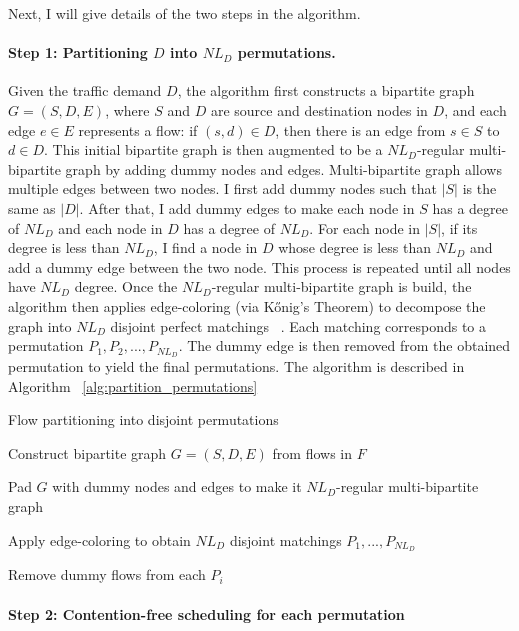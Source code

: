 Next, I
will give details of the two steps in the algorithm.

\paragraph{Step 1: Partitioning $D$ into $NL_D$ permutations.}
Given the traffic demand $D$, the algorithm first constructs a
bipartite graph \( G = (S, D, E) \), where \( S \) and \( D \) are
source and destination nodes in $D$, and each edge \( e \in E \) represents
a flow: if $(s, d) \in D$, then there is an edge from $s\in S$ to $d\in D$. 
This initial bipartite graph is then augmented to be a $NL_D$-regular
multi-bipartite graph by adding dummy nodes and edges. Multi-bipartite graph
allows multiple edges between two nodes. I first add dummy nodes such that
$|S|$ is the same as $|D|$. After that, I add dummy edges to make each node
in $S$ has a degree of $NL_D$ and each node in $D$ has a degree of $NL_D$.
For each node in $|S|$, if its degree is less than $NL_D$, I find a node
in $D$ whose degree is less than $NL_D$ and add a dummy edge between the
two node. This process is repeated until all nodes have $NL_D$ degree. Once
the $NL_D$-regular multi-bipartite graph is build, 
the algorithm then applies edge-coloring (via Kőnig’s Theorem)
to decompose the graph into \( NL_D \) disjoint perfect matchings ~\cite{konig1916graphen}. Each matching corresponds to a permutation
\( P_1, P_2, ..., P_{NL_D} \). The dummy edge is then removed from the
obtained permutation to yield the final permutations.
The algorithm is described in Algorithm ~\ref{alg:partition_permutations}

\begin{algorithm}[H]
\DontPrintSemicolon
\caption{Flow partitioning into disjoint permutations}
\label{alg:partition_permutations}


Construct bipartite graph $G = (S, D, E)$ from flows in $F$\;

Pad $G$ with dummy nodes and edges to make it $NL_D$-regular multi-bipartite
graph\;

Apply edge-coloring to obtain $NL_D$ disjoint matchings $P_1, ..., P_{NL_D}$\;

Remove dummy flows from each $P_i$\;

\end{algorithm}

\paragraph{Step 2: Contention-free scheduling for each permutation}  

